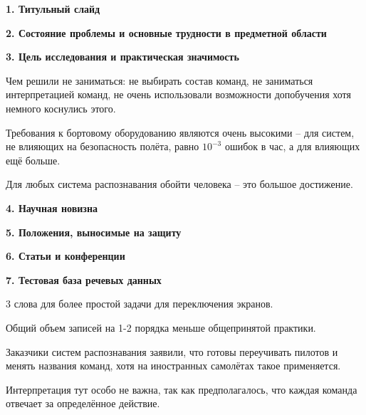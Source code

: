 \documentclass[a4paper, 12pt]{article}
\begin{document}
\begin{center}
	\textbf{\large 1. Титульный слайд}
\end{center}	



\begin{center}
	\textbf{\large 2. Состояние проблемы и основные трудности в предметной области}
\end{center}	



\begin{center}
	\textbf{\large 3. Цель исследования и практическая значимость}
\end{center}	

Чем решили не заниматься: не выбирать состав команд, не заниматься интерпретацией команд, не очень использовали возможности допобучения хотя немного коснулись этого.

Требования к бортовому оборудованию являются очень высокими – для систем, не влияющих на безопасность полёта, равно $10^{-3}$ ошибок в час, а для влияющих ещё больше.

Для любых система распознавания обойти человека – это большое достижение.




\begin{center}
	\textbf{\large 4. Научная новизна}
\end{center}	



\begin{center}
	\textbf{\large 5. Положения, выносимые на защиту}
\end{center}	



\begin{center}
	\textbf{\large 6. Статьи и конференции}
\end{center}	



\begin{center}
	\textbf{\large 7. Тестовая база речевых данных}
\end{center}	

3 слова для более простой задачи для переключения экранов.

Общий объем записей на 1-2 порядка меньше общепринятой практики.

Заказчики систем распознавания заявили, что готовы переучивать пилотов и менять названия команд, хотя на иностранных самолётах такое применяется.

Интерпретация тут особо не важна, так как предполагалось, что каждая команда отвечает за определённое действие. 
\end{document}
